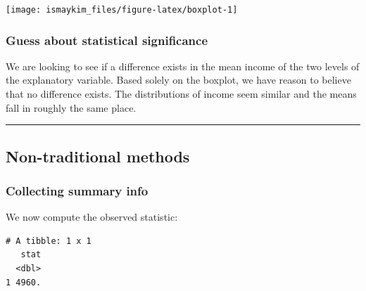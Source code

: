 \documentclass[12pt, krantz2,]{krantz}
\makeatletter
\newenvironment{Shaded}{\begin{snugshade}}{\end{snugshade}}
\newcommand{\DataTypeTok}[1]{\textcolor[rgb]{0.27,0.27,0.27}{#1}}
\newcommand{\KeywordTok}[1]{\textcolor[rgb]{0.27,0.27,0.27}{\textbf{#1}}}
\newcommand{\NormalTok}[1]{#1}
\newcommand{\OperatorTok}[1]{\textcolor[rgb]{0.43,0.43,0.43}{\textbf{#1}}}
\newcommand{\StringTok}[1]{\textcolor[rgb]{0.5,0.5,0.5}{#1}}
\newenvironment{kframe}{%
\medskip{}
\setlength{\fboxsep}{.8em}
 \def\at@end@of@kframe{}%
 \ifinner\ifhmode%
  \def\at@end@of@kframe{\end{minipage}}%
  \begin{minipage}{\columnwidth}%
 \fi\fi%
 \def\FrameCommand##1{\hskip\@totalleftmargin \hskip-\fboxsep
 \colorbox{shadecolor}{##1}\hskip-\fboxsep
     \hskip-\linewidth \hskip-\@totalleftmargin \hskip\columnwidth}%
 \MakeFramed {\advance\hsize-\width
   \@totalleftmargin\z@ \linewidth\hsize
   \@setminipage}}%
 {\par\unskip\endMakeFramed%
 \at@end@of@kframe}
\renewenvironment{Shaded}{\begin{kframe}}{\end{kframe}}
\makeatother
\begin{document}
\begin{center}\texttt{[image: ismaykim\_files/figure-latex/boxplot-1]} \end{center}

\hypertarget{guess-about-statistical-significance-3}{%
\subsubsection*{Guess about statistical significance}\label{guess-about-statistical-significance-3}}


We are looking to see if a difference exists in the mean income of the two levels of the explanatory variable. Based solely on the boxplot, we have reason to believe that no difference exists. The distributions of income seem similar and the means fall in roughly the same place.

\begin{center}\rule{0.5\linewidth}{\linethickness}\end{center}

\hypertarget{non-traditional-methods-3}{%
\subsection{Non-traditional methods}\label{non-traditional-methods-3}}

\hypertarget{collecting-summary-info-1}{%
\subsubsection*{Collecting summary info}\label{collecting-summary-info-1}}


We now compute the observed statistic:

\begin{Shaded}
\end{Shaded}

\begin{verbatim}
# A tibble: 1 x 1
   stat
  <dbl>
1 4960.
\end{verbatim}
\end{document}
